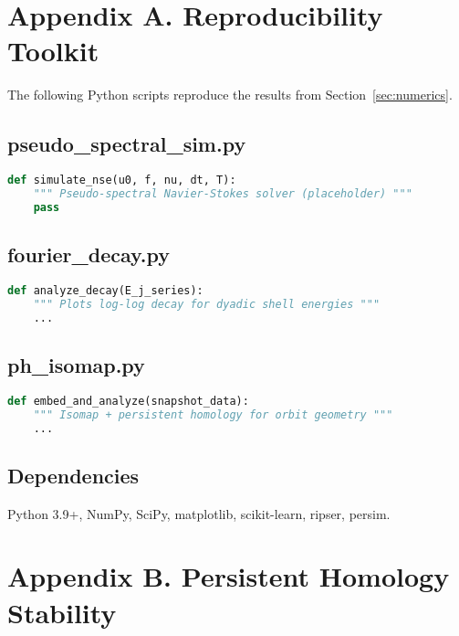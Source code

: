 \documentclass[11pt]{article}
\theoremstyle{definition}
\begin{document}
\appendix
\section{Appendix A. Reproducibility Toolkit}
\label{sec:appendixA}

The following Python scripts reproduce the results from Section~\ref{sec:numerics}.

\subsection*{pseudo\_spectral\_sim.py}
\begin{lstlisting}[language=Python]
def simulate_nse(u0, f, nu, dt, T):
    """ Pseudo-spectral Navier-Stokes solver (placeholder) """
    pass
\end{lstlisting}

\subsection*{fourier\_decay.py}
\begin{lstlisting}[language=Python]
def analyze_decay(E_j_series):
    """ Plots log-log decay for dyadic shell energies """
    ...
\end{lstlisting}

\subsection*{ph\_isomap.py}
\begin{lstlisting}[language=Python]
def embed_and_analyze(snapshot_data):
    """ Isomap + persistent homology for orbit geometry """
    ...
\end{lstlisting}

\subsection*{Dependencies}
Python 3.9+, NumPy, SciPy, matplotlib, scikit-learn, ripser, persim.


\section{Appendix B. Persistent Homology Stability}
\label{sec:appendixB}
\end{document}
